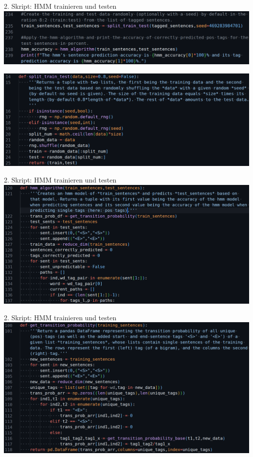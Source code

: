 \documentclass{beamer}
\begin{document}
\begin{frame}[t]{2. Skript: HMM trainieren und testen}
	\includegraphics[scale=0.43]{"./pics/hmm_script_pics/04.png"}
	
	\medskip
	
	\includegraphics[scale=0.4]{"./pics/hmm_script_pics/05.png"}
\end{frame}

\begin{frame}[t]{2. Skript: HMM trainieren und testen}
	\includegraphics[scale=0.43]{"./pics/hmm_script_pics/06.png"}
\end{frame}

\begin{frame}[t]{2. Skript: HMM trainieren und testen}
	\includegraphics[scale=0.43]{"./pics/hmm_script_pics/07.png"}
\end{frame}
\end{document}
